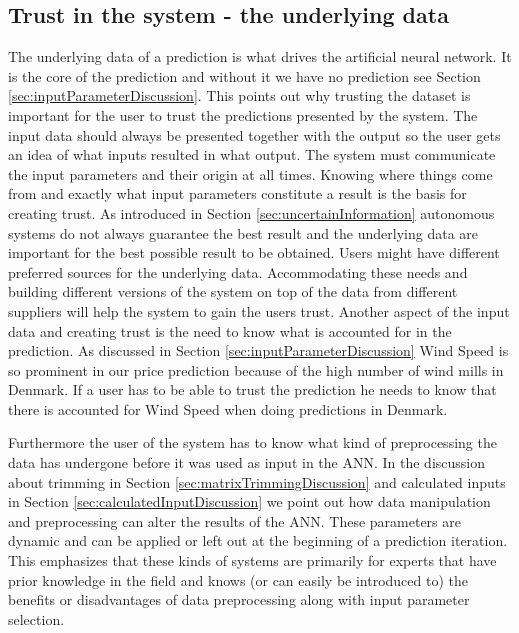\subsection{Trust in the system - the underlying data}
The underlying data of a prediction is what drives the artificial neural network. It is the core of the prediction and without it we have no prediction see Section \ref{sec:inputParameterDiscussion}. This points out why trusting the dataset is important for the user to trust the predictions presented by the system. The input data should always be presented together with the output so the user gets an idea of what inputs resulted in what output. The system must communicate the input parameters and their origin at all times. Knowing where things come from and exactly what input parameters constitute a result is the basis for creating trust. As introduced in Section \ref{sec:uncertainInformation} autonomous systems do not always guarantee the best result and the underlying data are important for the best possible result to be obtained. Users might have different preferred sources for the underlying data. Accommodating these needs and building different versions of the system on top of the data from different suppliers will help the system to gain the users trust. Another aspect of the input data and creating trust is the need to know what is accounted for in the prediction. As discussed in Section \ref{sec:inputParameterDiscussion} Wind Speed is so prominent in our price prediction because of the high number of wind mills in Denmark. If a user has to be able to trust the prediction he needs to know that there is accounted for Wind Speed when doing predictions in Denmark.

Furthermore the user of the system has to know what kind of preprocessing the data has undergone before it was used as input in the ANN. In the discussion about trimming in Section \ref{sec:matrixTrimmingDiscussion} and calculated inputs in Section \ref{sec:calculatedInputDiscussion} we point out how data manipulation and preprocessing can alter the results of the ANN. These parameters are dynamic and can be applied or left out at the beginning of a prediction iteration. This emphasizes that these kinds of systems are primarily for experts that have prior knowledge in the field and knows (or can easily be introduced to) the benefits or disadvantages of data preprocessing along with input parameter selection.


